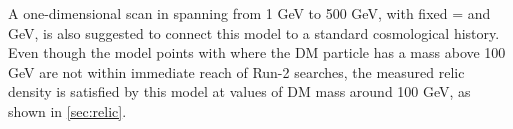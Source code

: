 A one-dimensional scan in \mDM spanning from 1 GeV to 500 GeV, with fixed \mA= and  GeV, is also suggested to connect this model to a standard cosmological history. Even though the model points with where the DM particle has a mass above 100 GeV are not within immediate reach of Run-2 searches, the measured relic density is satisfied by this model at values of DM mass around 100 GeV, as shown in \autoref{sec:relic}.


%
%
%
%
%
%
%
%
%
%
%
%
%
%
%
%
%
%
%
%
%


